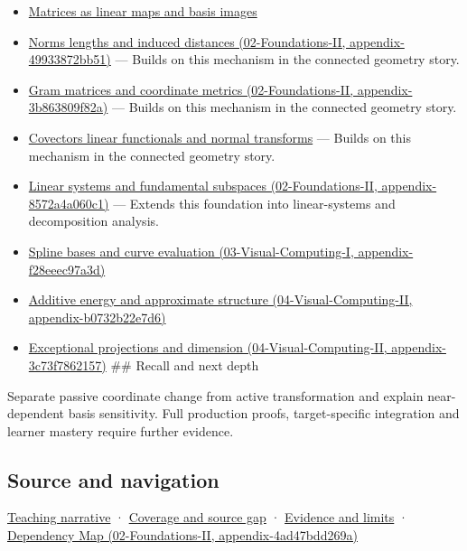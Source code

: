 \begin{itemize}
\item
  \hyperref[appendix-bd39c3bf5d64]{Matrices as linear maps and basis images}
\item
  \href{}{Norms lengths and induced distances (02-Foundations-II, appendix-49933872bb51)} --- Builds on this mechanism in the connected geometry story.
\item
  \href{}{Gram matrices and coordinate metrics (02-Foundations-II, appendix-3b863809f82a)} --- Builds on this mechanism in the connected geometry story.
\item
  \hyperref[appendix-46da295c6787]{Covectors linear functionals and normal transforms} --- Builds on this mechanism in the connected geometry story.
\item
  \href{}{Linear systems and fundamental subspaces (02-Foundations-II, appendix-8572a4a060c1)} --- Extends this foundation into linear-systems and decomposition analysis.
\item
  \href{}{Spline bases and curve evaluation (03-Visual-Computing-I, appendix-f28eeec97a3d)}
\item
  \href{}{Additive energy and approximate structure (04-Visual-Computing-II, appendix-b0732b22e7d6)}
\item
  \href{}{Exceptional projections and dimension (04-Visual-Computing-II, appendix-3c73f7862157)} \#\# Recall and next depth
\end{itemize}

Separate passive coordinate change from active transformation and explain near-dependent basis sensitivity. Full production proofs, target-specific integration and learner mastery require further evidence.

\subsection{Source and navigation}\label{source-and-navigation}

\href{Continuous\%20Notes/Computing\%20Foundations\%20-\%20From\%20Bits\%20to\%20C++\%20and\%20Systems\%20APIs\#A\%20basis\%20is\%20a\%20measuring\%20arrangement,\%20not\%20the\%20vector\%20itself}{Teaching narrative} · \hyperref[appendix-fd090d982a15]{Coverage and source gap} · \hyperref[appendix-a103e7846d21]{Evidence and limits} · \href{}{Dependency Map (02-Foundations-II, appendix-4ad47bdd269a)}
